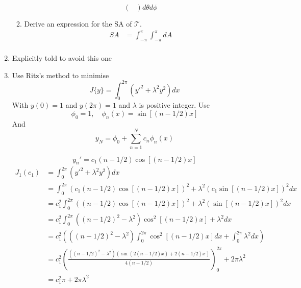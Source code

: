 \documentclass{X:/Documents/Coding/Latex/myassignment}
\begin{document}
\begin{enumerate}
\begin{enumerate}
\[\begin{pmatrix}
		\end{pmatrix}d\theta d\phi\]
		\item Derive an expression for the SA of $\mathcal{T}$.
		\begin{align*}
			SA &= \int_{-\pi}^\pi \int_{-\pi}^\pi dA\\
		\end{align*}
	\end{enumerate}
	\item Explicitly told to avoid this one
	\item Use Ritz's method to minimise
	\[J\{y\} = \int_0^{2\pi} (y'^2 + \lambda^2 y^2) dx\]
	With $y(0) = 1$ and $y(2\pi) = 1$ and $\lambda$ is positive integer. Use
	\[\phi_0 = 1, \quad \phi_n(x) = \sin[(n-1/2)x]\]
	And
	\[y_N = \phi_0 + \sum_{n=1}^N c_n \phi_n(x)\]

	\[y_n' =  c_1(n-1/2)\cos[(n-1/2)x]\]
	\begin{align*}
		J_1(c_1) &= \int_0^{2\pi} (y'^2 + \lambda^2 y^2) dx\\
		&= \int_0^{2\pi} (c_1(n-1/2)\cos[(n-1/2)x])^2 + \lambda^2(c_1\sin[(n-1/2)x])^2 dx\\
		&= c_1^2\int_0^{2\pi} ((n-1/2)\cos[(n-1/2)x])^2 + \lambda^2(\sin[(n-1/2)x])^2 dx\\
		&= c_1^2\int_0^{2\pi} ((n-1/2)^2-\lambda^2)\cos^2[(n-1/2)x] + \lambda^2 dx\\
		&= c_1^2 \left(((n-1/2)^2-\lambda^2)\int_0^{2\pi} \cos^2[(n-1/2)x] dx + \int_0^{2\pi} \lambda^2 dx\right) \\
		&= c_1^2 \left(\frac{((n-1/2)^2-\lambda^2)(\sin(2 (n-1/2)x) + 2(n-1/2)x)}{4(n-1/2)}\right)_0^{2\pi} + 2\pi\lambda^2 \\
		&= c_1^2 \pi + 2\pi\lambda^2 \\
	\end{align*}
\end{enumerate}
\end{document}
